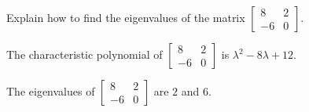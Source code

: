
\begin{exerciseStatement}


Explain how to find the eigenvalues of the matrix \( \left[\begin{array}{cc}
8 & 2 \\
-6 & 0
\end{array}\right] \).


\end{exerciseStatement}
    
\begin{exerciseAnswer} 


The characteristic polynomial of \( \left[\begin{array}{cc}
8 & 2 \\
-6 & 0
\end{array}\right] \) is \( \lambda^{2} - 8 \lambda + 12 \).



The eigenvalues of \( \left[\begin{array}{cc}
8 & 2 \\
-6 & 0
\end{array}\right] \) are \( 2 \) and \( 6 \).


\end{exerciseAnswer}
    
